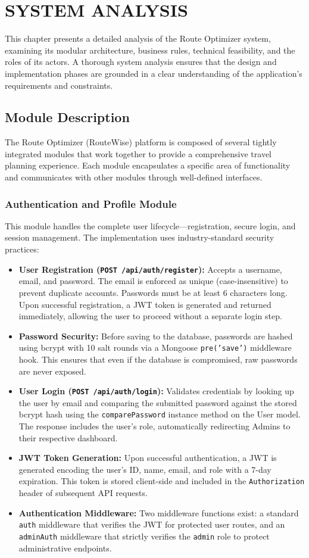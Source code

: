 \chapter{SYSTEM ANALYSIS}
This chapter presents a detailed analysis of the Route Optimizer system, examining its modular architecture, business rules, technical feasibility, and the roles of its actors. A thorough system analysis ensures that the design and implementation phases are grounded in a clear understanding of the application's requirements and constraints.

\section{Module Description}
The Route Optimizer (RouteWise) platform is composed of several tightly integrated modules that work together to provide a comprehensive travel planning experience. Each module encapsulates a specific area of functionality and communicates with other modules through well-defined interfaces.

\subsection{Authentication and Profile Module}
This module handles the complete user lifecycle---registration, secure login, and session management. The implementation uses industry-standard security practices:
\begin{itemize}
    \item \textbf{User Registration (\texttt{POST /api/auth/register}):} Accepts a username, email, and password. The email is enforced as unique (case-insensitive) to prevent duplicate accounts. Passwords must be at least 6 characters long. Upon successful registration, a JWT token is generated and returned immediately, allowing the user to proceed without a separate login step.
    \item \textbf{Password Security:} Before saving to the database, passwords are hashed using bcrypt with 10 salt rounds via a Mongoose \texttt{pre('save')} middleware hook. This ensures that even if the database is compromised, raw passwords are never exposed.
    \item \textbf{User Login (\texttt{POST /api/auth/login}):} Validates credentials by looking up the user by email and comparing the submitted password against the stored bcrypt hash using the \texttt{comparePassword} instance method on the User model. The response includes the user's role, automatically redirecting Admins to their respective dashboard.
    \item \textbf{JWT Token Generation:} Upon successful authentication, a JWT is generated encoding the user's ID, name, email, and role with a 7-day expiration. This token is stored client-side and included in the \texttt{Authorization} header of subsequent API requests.
    \item \textbf{Authentication Middleware:} Two middleware functions exist: a standard \texttt{auth} middleware that verifies the JWT for protected user routes, and an \texttt{adminAuth} middleware that strictly verifies the \texttt{admin} role to protect administrative endpoints.
\end{itemize}

